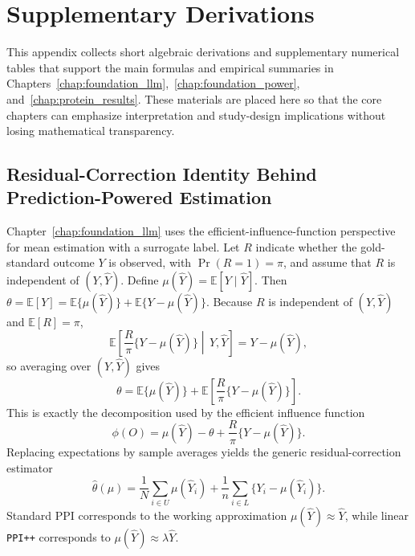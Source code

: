 \appendix
\makeatletter
{}
\makeatother
\renewcommand{\thechapter}{\Alph{chapter}}

\chapter{Supplementary Derivations} \label{chap:appendix-a}

This appendix collects short algebraic derivations and supplementary numerical tables that support the main formulas and empirical summaries in Chapters~\ref{chap:foundation_llm},~\ref{chap:foundation_power}, and~\ref{chap:protein_results}. These materials are placed here so that the core chapters can emphasize interpretation and study-design implications without losing mathematical transparency.

\section{Residual-Correction Identity Behind Prediction-Powered Estimation}

Chapter~\ref{chap:foundation_llm} uses the efficient-influence-function perspective for mean estimation with a surrogate label. Let $R$ indicate whether the gold-standard outcome $Y$ is observed, with \(\Pr(R=1)=\pi\), and assume that $R$ is independent of $(Y,\widehat{Y})$. Define \(\mu(\widehat{Y})=\mathbb{E}[Y\mid \widehat{Y}]\). Then \(\theta=\mathbb{E}[Y]=\mathbb{E}\{\mu(\widehat{Y})\}+\mathbb{E}\{Y-\mu(\widehat{Y})\}\).
Because $R$ is independent of $(Y,\widehat{Y})$ and $\mathbb{E}[R]=\pi$,
\[
\mathbb{E}\left[
\frac{R}{\pi}\{Y-\mu(\widehat{Y})\}
\middle|\,
Y,\widehat{Y}
\right]
=
Y-\mu(\widehat{Y}),
\]
so averaging over $(Y,\widehat{Y})$ gives
\[
\theta
=
\mathbb{E}\{\mu(\widehat{Y})\}
+
\mathbb{E}\left[
\frac{R}{\pi}\{Y-\mu(\widehat{Y})\}
\right].
\]
This is exactly the decomposition used by the efficient influence function
\[
\phi(O)
=
\mu(\widehat{Y})-\theta
+
\frac{R}{\pi}\{Y-\mu(\widehat{Y})\}.
\]
Replacing expectations by sample averages yields the generic residual-correction estimator
\[
\widehat{\theta}(\mu)
=
\frac{1}{N}\sum_{i\in U}\mu(\widehat{Y}_i)
+
\frac{1}{n}\sum_{i\in L}\{Y_i-\mu(\widehat{Y}_i)\}.
\]
Standard PPI corresponds to the working approximation $\mu(\widehat{Y})\approx \widehat{Y}$, while linear \texttt{PPI++} corresponds to $\mu(\widehat{Y})\approx \lambda \widehat{Y}$.

